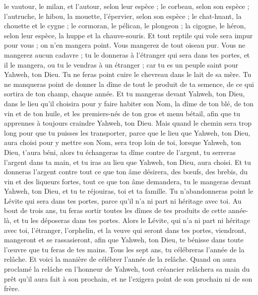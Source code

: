 \begin{multicols}{2}
le vautour, le milan, et l'autour, selon leur espèce ;
le corbeau, selon son espèce ;
l’autruche, le hibou, la mouette, l’épervier, selon son espèce ;
le chat-huant, la chouette et le cygne ;
le cormoran, le pélican, le plongeon ;
la cigogne, le héron, selon leur espèce, la huppe et la chauve-souris.
Et tout reptile qui vole sera impur pour vous ; on n'en mangera point.
Vous mangerez de tout oiseau pur.
Vous ne mangerez aucun cadavre ; tu le donneras à l'étranger qui sera dans tes portes, et il le mangera, ou tu le vendras à un étranger ; car tu es un peuple saint pour Yahweh, ton Dieu. Tu ne feras point cuire le chevreau dans le lait de sa mère.
Tu ne manqueras point de donner la dîme de tout le produit de ta semence, de ce qui sortira de ton champ, chaque année.
Et tu mangeras devant Yahweh, ton Dieu, dans le lieu qu'il choisira pour y faire habiter son Nom, la dîme de ton blé, de ton vin et de ton huile, et les premiers-nés de ton gros et menu bétail, afin que tu apprennes à toujours craindre Yahweh, ton Dieu.
Mais quand le chemin sera trop long pour que tu puisses les transporter, parce que le lieu que Yahweh, ton Dieu, aura choisi pour y mettre son Nom, sera trop loin de toi, lorsque Yahweh, ton Dieu, t'aura béni,
alors tu échangeras ta dîme contre de l’argent, tu serreras l'argent dans ta main, et tu iras au lieu que Yahweh, ton Dieu, aura choisi.
Et tu donneras l’argent contre tout ce que ton âme désirera, des bœufs, des brebis, du vin et des liqueurs fortes, tout ce que ton âme demandera, tu le mangeras devant Yahweh, ton Dieu, et tu te réjouiras, toi et ta famille.
Tu n'abandonneras point le Lévite qui sera dans tes portes, parce qu'il n'a ni part ni héritage avec toi.
Au bout de trois ans, tu feras sortir toutes les dîmes de tes produits de cette année-là, et tu les déposeras dans tes portes.
Alors le Lévite, qui n'a ni part ni héritage avec toi, l'étranger, l'orphelin, et la veuve qui seront dans tes portes, viendront, mangeront et se rassasieront, afin que Yahweh, ton Dieu, te bénisse dans toute l’œuvre que tu feras de tes mains.
\VerseOne{}Tous les sept ans, tu célébreras l’année de la relâche.
Et voici la manière de célébrer l’année de la relâche. Quand on aura proclamé la relâche en l'honneur de Yahweh, tout créancier relâchera sa main du prêt qu’il aura fait à son prochain, et ne l'exigera point de son prochain ni de son frère.

\end{multicols}
